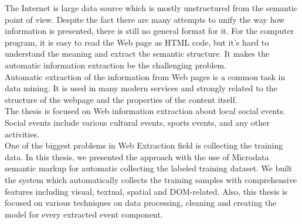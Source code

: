 \abstractpage

The Internet is large data source which is mostly unstructured from the semantic point of view. Despite the fact there are many attempts to unify the way how information is presented, there is still no general format for it. For the computer program, it is easy to read the Web page as HTML code, but it's hard to understand the meaning and extract the semantic structure. It makes the automatic information extraction be the challenging problem. \\

Automatic extraction of the information from Web pages is a common task in data mining. It is used in many modern services and strongly related to the structure of the webpage and the properties of the content itself.\\

The thesis is focused on Web information extraction about local social events. Social events include various cultural events, sports events, and any other activities. \\

One of the biggest problems in Web Extraction field is collecting the training data. In this thesis, we presented the approach with the use of Microdata semantic markup for automatic collecting the labeled training dataset. We built the system which automatically collects the training samples with comprehensive features including visual, textual, spatial and DOM-related. Also, this thesis is focused on various techniques on data processing, cleaning and creating the model for every extracted event component.  